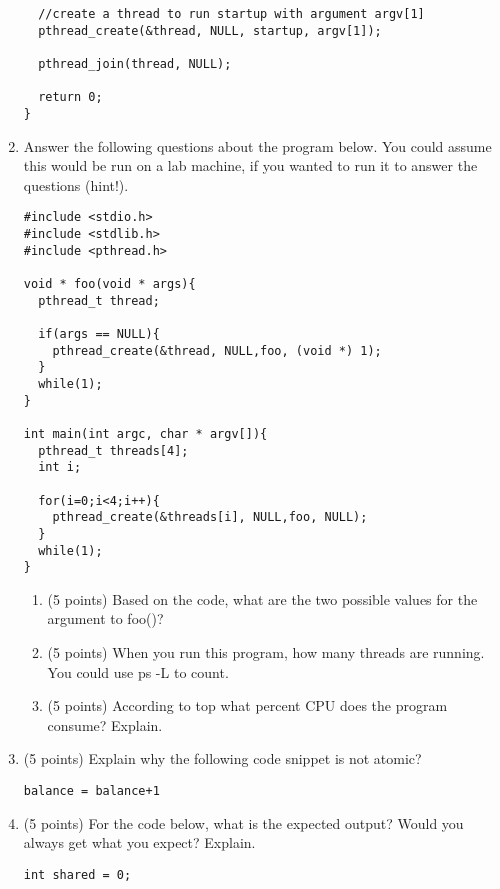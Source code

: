 \documentclass{article}[9pt]
\newenvironment{answerfont}{\fontfamily{qhv}\selectfont}{\par}
\newenvironment{myanswer}{\begin{mdframed}\begin{answerfont}}{\end{answerfont}\end{mdframed}}
\begin{document}
\begin{enumerate}
\begin{verbatim}
  //create a thread to run startup with argument argv[1]
  pthread_create(&thread, NULL, startup, argv[1]);

  pthread_join(thread, NULL);

  return 0;
}
  \end{verbatim}
  
      
\item Answer the following questions about the program below. You could assume this would be run on a lab machine, if you wanted to run it to answer the questions (hint!).
  \begin{verbatim}
#include <stdio.h>
#include <stdlib.h>
#include <pthread.h>

void * foo(void * args){
  pthread_t thread;

  if(args == NULL){
    pthread_create(&thread, NULL,foo, (void *) 1);
  }
  while(1);
}

int main(int argc, char * argv[]){
  pthread_t threads[4];
  int i;

  for(i=0;i<4;i++){
    pthread_create(&threads[i], NULL,foo, NULL);
  }
  while(1);
}
  \end{verbatim}
  \begin{enumerate}
    \item (5 points) Based on the code, what are the two possible values for the argument to foo()?
      \begin{myanswer}
      \end{myanswer}
    \item (5 points) When you run this program, how many threads are running. You could use ps -L to count.
      \begin{myanswer}
      \end{myanswer}
    \item (5 points) According to top what percent CPU does the program consume? Explain.
      \begin{myanswer}
      \end{myanswer}
    \end{enumerate}

\item (5 points) Explain why the following code snippet is not atomic?
\begin{verbatim}
balance = balance+1
\end{verbatim}
\begin{myanswer}
\end{myanswer}

\item (5 points) For the code below, what is the expected output? Would you always get what you expect? Explain.
\begin{verbatim}
int shared = 0;


\end{verbatim}
\end{enumerate}
\end{document}
